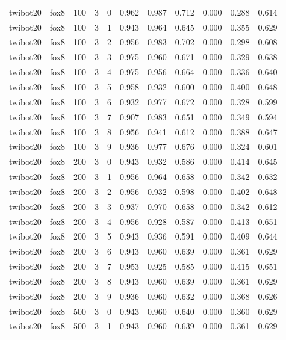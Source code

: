 \begin{tabular}{llrrrrrrrrr}
twibot20 & fox8 & 100 & 3 & 0 & 0.962 & 0.987 & 0.712 & 0.000 & 0.288 & 0.614 \\
twibot20 & fox8 & 100 & 3 & 1 & 0.943 & 0.964 & 0.645 & 0.000 & 0.355 & 0.629 \\
twibot20 & fox8 & 100 & 3 & 2 & 0.956 & 0.983 & 0.702 & 0.000 & 0.298 & 0.608 \\
twibot20 & fox8 & 100 & 3 & 3 & 0.975 & 0.960 & 0.671 & 0.000 & 0.329 & 0.638 \\
twibot20 & fox8 & 100 & 3 & 4 & 0.975 & 0.956 & 0.664 & 0.000 & 0.336 & 0.640 \\
twibot20 & fox8 & 100 & 3 & 5 & 0.958 & 0.932 & 0.600 & 0.000 & 0.400 & 0.648 \\
twibot20 & fox8 & 100 & 3 & 6 & 0.932 & 0.977 & 0.672 & 0.000 & 0.328 & 0.599 \\
twibot20 & fox8 & 100 & 3 & 7 & 0.907 & 0.983 & 0.651 & 0.000 & 0.349 & 0.594 \\
twibot20 & fox8 & 100 & 3 & 8 & 0.956 & 0.941 & 0.612 & 0.000 & 0.388 & 0.647 \\
twibot20 & fox8 & 100 & 3 & 9 & 0.936 & 0.977 & 0.676 & 0.000 & 0.324 & 0.601 \\
twibot20 & fox8 & 200 & 3 & 0 & 0.943 & 0.932 & 0.586 & 0.000 & 0.414 & 0.645 \\
twibot20 & fox8 & 200 & 3 & 1 & 0.956 & 0.964 & 0.658 & 0.000 & 0.342 & 0.632 \\
twibot20 & fox8 & 200 & 3 & 2 & 0.956 & 0.932 & 0.598 & 0.000 & 0.402 & 0.648 \\
twibot20 & fox8 & 200 & 3 & 3 & 0.937 & 0.970 & 0.658 & 0.000 & 0.342 & 0.612 \\
twibot20 & fox8 & 200 & 3 & 4 & 0.956 & 0.928 & 0.587 & 0.000 & 0.413 & 0.651 \\
twibot20 & fox8 & 200 & 3 & 5 & 0.943 & 0.936 & 0.591 & 0.000 & 0.409 & 0.644 \\
twibot20 & fox8 & 200 & 3 & 6 & 0.943 & 0.960 & 0.639 & 0.000 & 0.361 & 0.629 \\
twibot20 & fox8 & 200 & 3 & 7 & 0.953 & 0.925 & 0.585 & 0.000 & 0.415 & 0.651 \\
twibot20 & fox8 & 200 & 3 & 8 & 0.943 & 0.960 & 0.639 & 0.000 & 0.361 & 0.629 \\
twibot20 & fox8 & 200 & 3 & 9 & 0.936 & 0.960 & 0.632 & 0.000 & 0.368 & 0.626 \\
twibot20 & fox8 & 500 & 3 & 0 & 0.943 & 0.960 & 0.640 & 0.000 & 0.360 & 0.629 \\
twibot20 & fox8 & 500 & 3 & 1 & 0.943 & 0.960 & 0.639 & 0.000 & 0.361 & 0.629 \\

\end{tabular}
